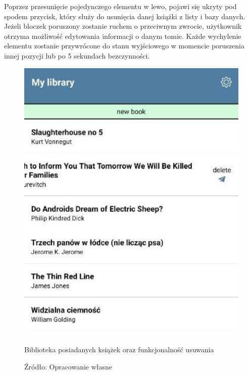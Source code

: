 Poprzez przesunięcie pojedynczego elementu w lewo, pojawi się ukryty pod spodem przycisk, który służy do usunięcia danej książki z listy i bazy danych. Jeżeli bloczek poruszony zostanie ruchem o przeciwnym zwrocie, użytkownik otrzyma możliwość edytowania informacji o danym tomie.
Każde wychylenie elementu zostanie przywrócone do stanu wyjściowego w momencie poruszenia innej pozycji lub po 5 sekundach bezczynności.
\begin{figure}[H]
	\centering
	\includegraphics{mylib.pdf}
	\caption{\centering Biblioteka posiadanych książek oraz funkcjonalność usuwania}
	\caption*{\centering Źródło: {Opracowanie własne}}
\end{figure}


